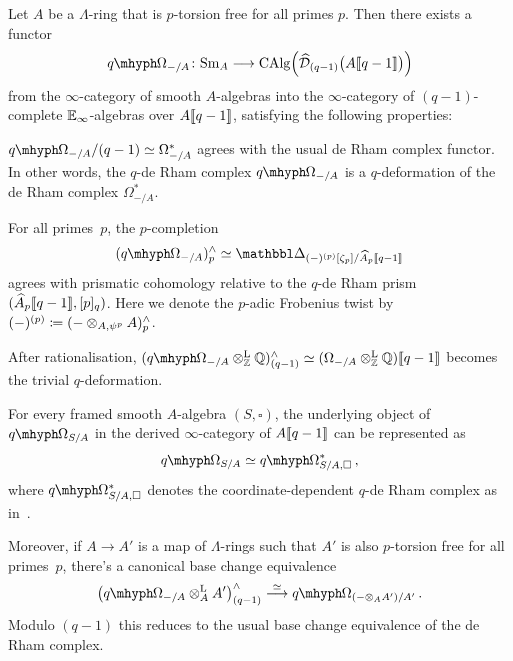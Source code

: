 \documentclass[DIV=12,numbers=enddot,leqno,bibliography=totoc]{scrartcl}
\begin{document}
	\begin{thm}\label{thm:qDeRhamGlobal}
		Let $A$ be a $\Lambda$-ring that is $p$-torsion free for all primes $p$. Then there exists a functor
		\begin{equation*}
			\qOmega_{-/A}\colon \cat{Sm}_A\longrightarrow \CAlg\left(\widehat{\Dd}_{(q-1)}\bigl(A\qpower\bigr)\right)
		\end{equation*}
		from the $\infty$-category of smooth $A$-algebras into the $\infty$-category of $(q-1)$-complete $\mathbb{E}_\infty$-algebras over $A\llbracket q-1\rrbracket$, satisfying the following properties:
		\begin{alphanumerate}
			\item $\qOmega_{-/A}/(q-1)\simeq \Omega_{-/A}^*$ agrees with the usual de Rham complex functor. In other words, the $q$-de Rham complex $\qOmega_{-/A}$ is a $q$-deformation of the de Rham complex $\Omega_{-/A}^*$.\label{enum:GlobalqDeRhamDeformsDeRham}
			\item For all primes~$p$, the $p$-completion\label{enum:GlobalqDeRhamPrismatic}
			\begin{equation*}
				(\qOmega_{-/A})_p^\complete\simeq \Prism_{(-)^{(p)}[\zeta_p]/\smash{\widehat{A}}_p\qpower}
			\end{equation*}
			agrees with prismatic cohomology relative to the $q$-de Rham prism $(\widehat{A}_p\llbracket q-1\rrbracket,[p]_q)$. Here we denote the $p$-adic Frobenius twist by $(-)^{(p)}\coloneqq (-\otimes_{A,\psi^p}A)_p^\complete$.
			\item After rationalisation, $(\qOmega_{-/A}\lotimes_\IZ\IQ)_{(q-1)}^\complete\simeq (\Omega_{-/A}\lotimes_\IZ\IQ)\qpower$ becomes the trivial $q$-deformation.\label{enum:GlobalqDeRhamRational}
			\item For every framed smooth $A$-algebra $(S,\square)$, the underlying object of $\qOmega_{S/A}$ in the derived $\infty$-category of $A\llbracket q-1\rrbracket$ can be represented as\label{enum:GlobalqDeRhamCoordinates}
			\begin{equation*}
				\qOmega_{S/A}\simeq \qOmega_{S/A, \square}^*\,,
			\end{equation*}
			where $\qOmega_{S/A, \square}^*$ denotes the coordinate-dependent $q$-de Rham complex as in~\cite[\textup{\S{}}]{Toulouse}.
		\end{alphanumerate}
		Moreover, if $A\rightarrow A'$ is a map of $\Lambda$-rings such that $A'$ is also $p$-torsion free for all primes~$p$, there's a canonical base change equivalence
		\begin{equation*}
			\bigl(\qOmega_{-/A}\lotimes_{A}A'\bigr)_{(q-1)}^\complete\overset{\simeq}{\longrightarrow}\qOmega_{(-\otimes_AA')/A'}\,.
		\end{equation*}
		Modulo $(q-1)$ this reduces to the usual base change equivalence of the de Rham complex.
	\end{thm}
\end{document}
